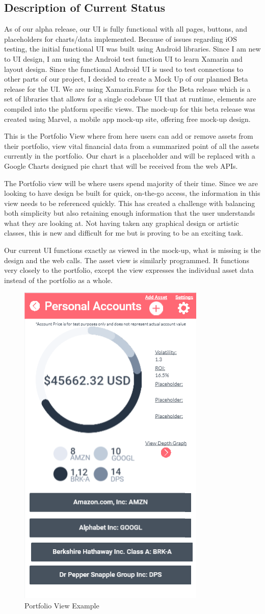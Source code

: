 \documentclass[letterpaper,10pt,titlepage,journal,compsoc,draftclsnofoot,onecolumn]{IEEEtran}
\begin{document}
\subsection{Description of Current Status}
As of our alpha release, our UI is fully functional with all pages, buttons, and placeholders for charts/data implemented. Because of issues regarding iOS testing, the initial functional UI was built using Android libraries. Since I am new to UI design, I am using the Android test function UI to learn Xamarin and layout design. Since the functional Android UI is used to test connections to other parts of our project, I decided to create a Mock Up of our planned Beta release for the UI. We are using Xamarin.Forms for the Beta release which is a set of libraries that allows for a single codebase UI that at runtime, elements are compiled into the platform specific views. The mock-up for this beta release was created using Marvel, a mobile app mock-up site, offering free mock-up design.

This is the Portfolio View where from here users can add or remove assets from their portfolio, view vital financial data from a summarized point of all the assets currently in the portfolio. Our chart is a placeholder and will be replaced with a Google Charts designed pie chart that will be received from the web APIs.  


The Portfolio view will be where users spend majority of their time. Since we are looking to have design be built for quick, on-the-go access, the information in this view needs to be referenced quickly. This has created a challenge with balancing both simplicity but also retaining enough information that the user understands what they are looking at. Not having taken any graphical design or artistic classes, this is new and difficult for me but is proving to be an exciting task.

Our current UI functions exactly as viewed in the mock-up, what is missing is the design and the web calls. The asset view is similarly programmed. It functions very closely to the portfolio, except the view expresses the individual asset data instead of the portfolio as a whole.
\begin{figure}
   \caption{Portfolio View Example}
   \begin{center}
   \includegraphics[width=.35\textwidth]{portfolio_screenshot}
\end{center}
\end{figure}
\end{document}
